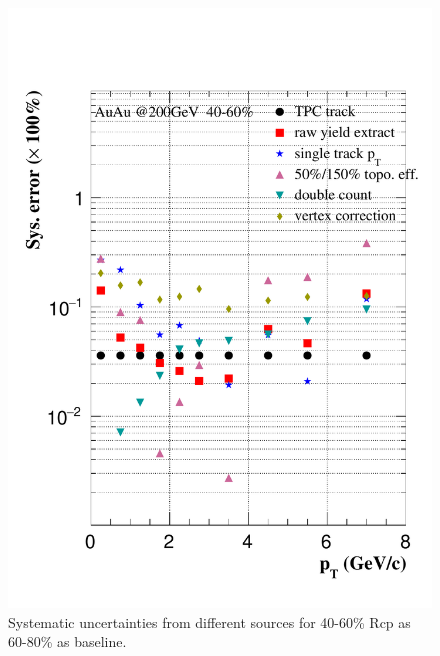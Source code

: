 \begin{figure}[htbp]
\begin{minipage}[htbp]{0.47\linewidth}
\includegraphics[width=1.0\textwidth,angle=0]{figure/Run14_D0HFT/sysErr_40_60_Rcp1.pdf} 
\caption{ Systematic uncertainties from different sources for 40-60\% Rcp as 60-80\% as baseline. \label{sysErr_40_60_Rcp1}}
\end{minipage}
\end{figure}



